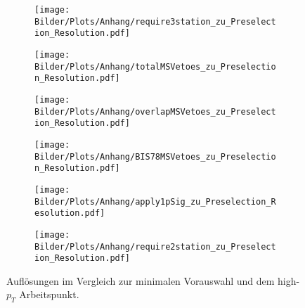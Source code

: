 \begin{figure}
  \begin{subfigure}[t]{0.5\textwidth}
  \texttt{[image: Bilder/Plots/Anhang/require3station\_zu\_Preselection\_Resolution.pdf]}
  \end{subfigure}
\begin{subfigure}[t]{0.5\textwidth}
 \texttt{[image: Bilder/Plots/Anhang/totalMSVetoes\_zu\_Preselection\_Resolution.pdf]}
\end{subfigure}
\begin{subfigure}[t]{0.5\textwidth}
  \texttt{[image: Bilder/Plots/Anhang/overlapMSVetoes\_zu\_Preselection\_Resolution.pdf]}
\end{subfigure}
\begin{subfigure}[t]{0.5\textwidth}
  \texttt{[image: Bilder/Plots/Anhang/BIS78MSVetoes\_zu\_Preselection\_Resolution.pdf]}
\end{subfigure}
\begin{subfigure}[t]{0.5\textwidth}
  \texttt{[image: Bilder/Plots/Anhang/apply1pSig\_zu\_Preselection\_Resolution.pdf]}
\end{subfigure}
\begin{subfigure}[t]{0.5\textwidth}
  \texttt{[image: Bilder/Plots/Anhang/require2station\_zu\_Preselection\_Resolution.pdf]}
\end{subfigure}
\caption{Auflösungen im Vergleich zur minimalen Vorauswahl und dem high-$p_T$ Arbeitspunkt.}
\end{figure}
